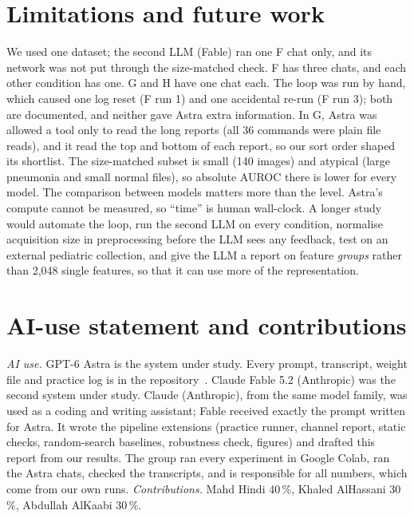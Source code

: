 \section{Limitations and future work}
We used one dataset; the second LLM (Fable) ran one F chat only, and its network was not put through the size-matched check.
F has three chats, and each other condition has one.
G and H have one chat each.
The loop was run by hand, which caused one log reset (F run 1) and one accidental re-run (F run 3); both are documented, and neither gave Astra extra information.
In G, Astra was allowed a tool only to read the long reports (all 36 commands were plain file reads), and it read the top and bottom of each report, so our sort order shaped its shortlist.
The size-matched subset is small (140 images) and atypical (large pneumonia and small normal files), so absolute AUROC there is lower for every model.
The comparison between models matters more than the level.
Astra's compute cannot be measured, so ``time'' is human wall-clock.
A longer study would automate the loop, run the second LLM on every condition, normalise acquisition size in preprocessing before the LLM sees any feedback, test on an external pediatric collection, and give the LLM a report on feature \emph{groups} rather than 2,048 single features, so that it can use more of the representation.

\section*{AI-use statement and contributions}
\emph{AI use.} GPT-6 Astra is the system under study.
Every prompt, transcript, weight file and practice log is in the repository~\cite{repo}.
Claude Fable 5.2 (Anthropic) was the second system under study.
Claude (Anthropic), from the same model family, was used as a coding and writing assistant; Fable received exactly the prompt written for Astra.
It wrote the pipeline extensions (practice runner, channel report, static checks, random-search baselines, robustness check, figures) and drafted this report from our results.
The group ran every experiment in Google Colab, ran the Astra chats, checked the transcripts, and is responsible for all numbers, which come from our own runs.
\emph{Contributions.} Mahd Hindi 40\,\%, Khaled AlHassani 30\,\%, Abdullah AlKaabi 30\,\%.

